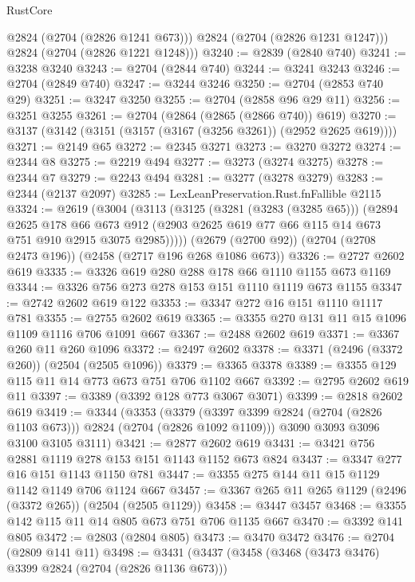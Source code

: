 \begin{lexlean}{RustCore}
\begin{coremodule}
          @2824
          (@2704 (@2826 @1241 @673)))
        @2824
        (@2704 (@2826 @1231 @1247)))
      @2824
      (@2704 (@2826 @1221 @1248)))
@3240 := @2839 (@2840 @740)
@3241 := @3238 @3240
@3243 := @2704 (@2844 @740)
@3244 := @3241 @3243
@3246 := @2704 (@2849 @740)
@3247 := @3244 @3246
@3250 := @2704 (@2853 @740 @29)
@3251 := @3247 @3250
@3255 := @2704 (@2858 @96 @29 @11)
@3256 := @3251 @3255
@3261 := @2704 (@2864 (@2865 (@2866 @740)) @619)
@3270 := @3137 (@3142 (@3151 (@3157 (@3167 (@3256 @3261)) (@2952 @2625 @619))))
@3271 := @2149 @65
@3272 := @2345 @3271
@3273 := @3270 @3272
@3274 := @2344 @8
@3275 := @2219 @494
@3277 := @3273 (@3274 @3275)
@3278 := @2344 @7
@3279 := @2243 @494
@3281 := @3277 (@3278 @3279)
@3283 := @2344 (@2137 @2097)
@3285 := LexLeanPreservation.Rust.fnFallible @2115
@3324 := @2619
    (@3004
      (@3113
        (@3125
          (@3281 (@3283 (@3285 @65)))
          (@2894
            @2625
            @178
            @66
            @673
            @912
            (@2903 @2625 @619 @77 @66 @115 @14 @673 @751 @910 @2915 @3075 @2985)))))
    (@2679 (@2700 @92))
    (@2704 (@2708 @2473 @196))
    (@2458 (@2717 @196 @268 @1086 @673))
@3326 := @2727 @2602 @619
@3335 := @3326 @619 @280 @288 @178 @66 @1110 @1155 @673 @1169
@3344 := @3326 @756 @273 @278 @153 @151 @1110 @1119 @673 @1155
@3347 := @2742 @2602 @619 @122
@3353 := @3347 @272 @16 @151 @1110 @1117 @781
@3355 := @2755 @2602 @619
@3365 := @3355 @270 @131 @11 @15 @1096 @1109 @1116 @706 @1091 @667
@3367 := @2488 @2602 @619
@3371 := @3367 @260 @11 @260 @1096
@3372 := @2497 @2602
@3378 := @3371 (@2496 (@3372 @260)) (@2504 (@2505 @1096))
@3379 := @3365 @3378
@3389 := @3355 @129 @115 @11 @14 @773 @673 @751 @706 @1102 @667
@3392 := @2795 @2602 @619 @11
@3397 := @3389 (@3392 @128 @773 @3067 @3071)
@3399 := @2818 @2602 @619
@3419 := @3344
    (@3353
      (@3379 (@3397 @3399 @2824 (@2704 (@2826 @1103 @673))) @2824 (@2704 (@2826 @1092 @1109)))
      @3090
      @3093
      @3096
      @3100
      @3105
      @3111)
@3421 := @2877 @2602 @619
@3431 := @3421 @756 @2881 @1119 @278 @153 @151 @1143 @1152 @673 @824
@3437 := @3347 @277 @16 @151 @1143 @1150 @781
@3447 := @3355 @275 @144 @11 @15 @1129 @1142 @1149 @706 @1124 @667
@3457 := @3367 @265 @11 @265 @1129 (@2496 (@3372 @265)) (@2504 (@2505 @1129))
@3458 := @3447 @3457
@3468 := @3355 @142 @115 @11 @14 @805 @673 @751 @706 @1135 @667
@3470 := @3392 @141 @805
@3472 := @2803 (@2804 @805)
@3473 := @3470 @3472
@3476 := @2704 (@2809 @141 @11)
@3498 := @3431
    (@3437
      (@3458
        (@3468 (@3473 @3476) @3399 @2824 (@2704 (@2826 @1136 @673)))

\end{coremodule}
\end{lexlean}
